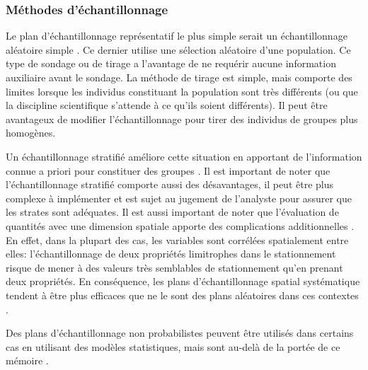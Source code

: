             \subsubsection{Méthodes d'échantillonnage}
                Le plan d'échantillonnage représentatif le plus simple serait un échantillonnage aléatoire simple \parencite{tille_theorie_2019}. Ce dernier utilise une sélection aléatoire d'une population. Ce type de sondage ou de tirage a l'avantage de ne requérir aucune information auxiliaire avant le sondage. La méthode de tirage est simple, mais comporte des limites lorsque les individus constituant la population sont très différents (ou que la discipline scientifique s'attende à ce qu'ils soient différents). Il peut être avantageux de modifier l'échantillonnage pour tirer des individus de groupes plus homogènes.\par
                Un échantillonnage stratifié améliore cette situation en apportant de l'information connue a priori pour constituer des groupes \parencite{gumuchian_initiation_2000,tille_theorie_2019,cochran_sampling_1963}. Il est important de noter que l'échantillonnage stratifié comporte aussi des désavantages, il peut être plus complexe à implémenter et est sujet au jugement de l'analyste pour assurer que les strates sont adéquates. Il est aussi important de noter que l'évaluation de quantités avec une dimension spatiale apporte des complications additionnelles \parencite{wang_review_2012}. En effet, dans la plupart des cas, les variables sont corrélées spatialement entre elles: l'échantillonnage de deux propriétés limitrophes dans le stationnement risque de mener à des valeurs très semblables de stationnement qu'en prenant deux propriétés. En conséquence, les plans d'échantillonnage spatial systématique tendent à être plus efficaces que ne le sont des plans aléatoires dans ces contextes \parencite{perret_spatially_2022}.\par
                Des plans d'échantillonnage non probabilistes peuvent être utilisés dans certains cas en utilisant des modèles statistiques, mais sont au-delà de la portée de ce mémoire \parencite{brus_spatial_2023}. \par
